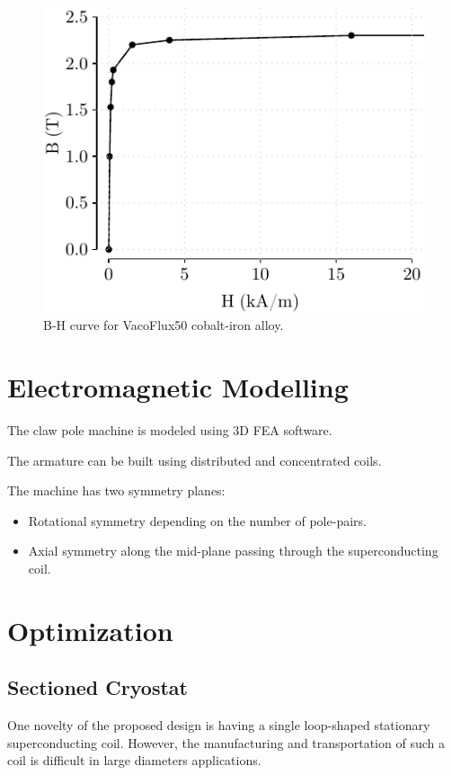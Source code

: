 \documentclass[final,peerreview,onecolumn]{IEEEtran}
\begin{document}
\begin{figure}[t]
  \centering
    \includegraphics[]{vacoflux_50}
  \caption{B-H curve for  VacoFlux50 cobalt-iron alloy\cite{vacoflux}.}
  \label{vacoflux-bh}
\end{figure}



\section{Electromagnetic Modelling}	
The claw pole machine is modeled using 3D FEA software.

The armature can be built using distributed and concentrated coils.

The machine has two symmetry planes:

\begin{itemize}
	\item Rotational symmetry depending on the number of pole-pairs.
	\item Axial symmetry along the mid-plane passing through the superconducting coil.
\end{itemize}

\section{Optimization}


\subsection{Sectioned Cryostat}

One novelty of the proposed design is having a single loop-shaped stationary superconducting coil.
However, the manufacturing and transportation of such a coil is difficult in large diameters applications. 
\end{document}
